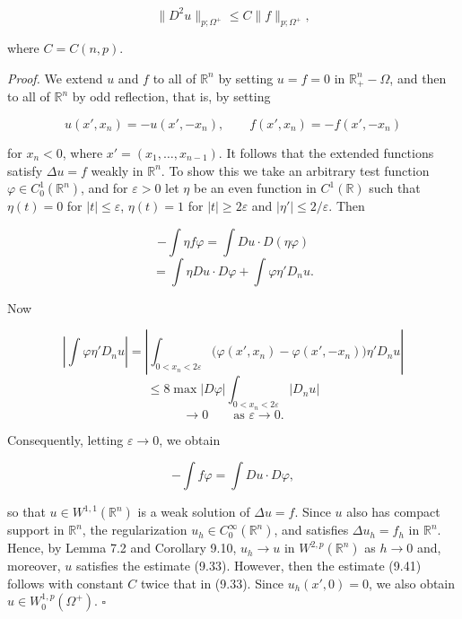 \begin{equation}
\tag{9.41}
\|D^2u\|_{p;\Omega^+} \le C\|f\|_{p;\Omega^+},
\end{equation}

\noindent where $C = C(n,p)$.

\noindent \textit{Proof.} We extend $u$ and $f$ to all of $\mathbb{R}^n$ by setting $u = f = 0$ in $\mathbb{R}^n_+ - \Omega$, and then to all of $\mathbb{R}^n$ by odd reflection, that is, by setting

\begin{equation*}
u(x',x_n) = -u(x',-x_n), \qquad f(x',x_n) = -f(x',-x_n)
\end{equation*}

\noindent for $x_n < 0$, where $x' = (x_1,\ldots,x_{n-1})$. It follows that the extended functions satisfy $\Delta u = f$ weakly in $\mathbb{R}^n$. To show this we take an arbitrary test function $\varphi \in C^1_0(\mathbb{R}^n)$, and for $\varepsilon > 0$ let $\eta$ be an even function in $C^1(\mathbb{R})$ such that $\eta(t) = 0$ for $|t| \le \varepsilon$, $\eta(t) = 1$ for $|t| \ge 2\varepsilon$ and $|\eta'| \le 2/\varepsilon$. Then

\begin{equation*}
- \int \eta f\varphi = \int Du \cdot D(\eta\varphi)
\end{equation*}
\begin{equation*}
= \int \eta Du \cdot D\varphi + \int \varphi\eta' D_n u.
\end{equation*}

\noindent Now

\begin{equation*}
\left|\int \varphi\eta' D_n u\right| =
\left|\int_{0 < x_n < 2\varepsilon} \bigl(\varphi(x',x_n) - \varphi(x',-x_n)\bigr)\eta' D_n u\right|
\end{equation*}
\begin{equation*}
\le 8 \max |D\varphi| \int_{0 < x_n < 2\varepsilon} |D_n u|
\end{equation*}
\begin{equation*}
\to 0 \qquad \text{as } \varepsilon \to 0.
\end{equation*}

\noindent Consequently, letting $\varepsilon \to 0$, we obtain

\begin{equation*}
- \int f\varphi = \int Du \cdot D\varphi,
\end{equation*}

\noindent so that $u \in W^{1,1}(\mathbb{R}^n)$ is a weak solution of $\Delta u = f$.
Since $u$ also has compact support in $\mathbb{R}^n$, the regularization $u_h \in C^\infty_0(\mathbb{R}^n)$, and satisfies $\Delta u_h = f_h$ in $\mathbb{R}^n$. Hence, by Lemma 7.2 and Corollary 9.10, $u_h \to u$ in $W^{2,p}(\mathbb{R}^n)$ as $h \to 0$ and, moreover, $u$ satisfies the estimate (9.33). However, then the estimate (9.41) follows with constant $C$ twice that in (9.33). Since $u_h(x',0) = 0$, we also obtain $u \in W^{1,p}_0(\Omega^+)$. $\square$

